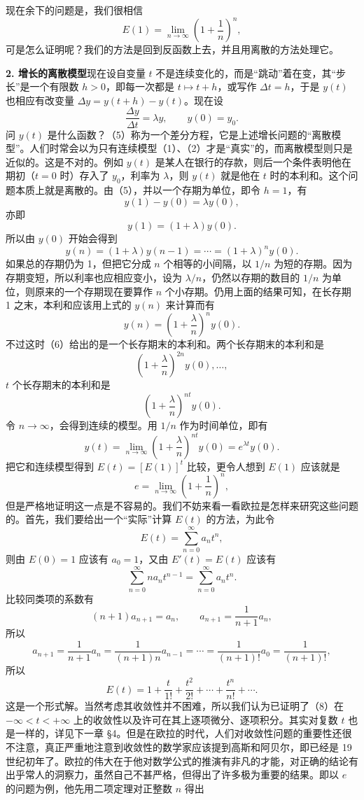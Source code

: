 现在余下的问题是，我们很相信
\[
E(1)=\lim_{n\to\infty}\left(1+\frac1n\right)^n,
\]
可是怎么证明呢？我们的方法是回到反函数上去，并且用离散的方法处理它。

\textbf{2. 增长的离散模型}\quad 现在设自变量 $t$ 不是连续变化的，而是“跳动”着在变，其“步长”是一个有限数 $h>0$，即每一次都是 $t\mapsto t+h$，或写作 $\Delta t=h$，于是 $y(t)$ 也相应有改变量 $\Delta y=y(t+h)-y(t)$。现在设
\[
\frac{\Delta y}{\Delta t}=\lambda y,\qquad y(0)=y_0. \tag{5}
\]
问 $y(t)$ 是什么函数？（5）称为一个差分方程，它是上述增长问题的“离散模型”。人们时常会以为只有连续模型（1）、（2）才是“真实”的，而离散模型则只是近似的。这是不对的。例如 $y(t)$ 是某人在银行的存款，则后一个条件表明他在期初（$t=0$ 时）存入了 $y_0$，利率为 $\lambda$，则 $y(t)$ 就是他在 $t$ 时的本利和。这个问题本质上就是离散的。由（5），并以一个存期为单位，即令 $h=1$，有
\[
y(1)-y(0)=\lambda y(0),
\]
亦即
\[
y(1)=(1+\lambda)y(0).
\]
所以由 $y(0)$ 开始会得到
\[
y(n)=(1+\lambda)y(n-1)=\cdots=(1+\lambda)^ny(0).
\]
如果总的存期仍为 1，但把它分成 $n$ 个相等的小间隔，以 $1/n$ 为短的存期。因为存期变短，所以利率也应相应变小，设为 $\lambda/n$，仍然以存期的数目的 $1/n$ 为单位，则原来的一个存期现在要算作 $n$ 个小存期。仍用上面的结果可知，在长存期 1 之末，本利和应该用上式的 $y(n)$ 来计算而有
\[
y(n)=\left(1+\frac{\lambda}{n}\right)^ny(0). \tag{6}
\]
不过这时（6）给出的是一个长存期末的本利和。两个长存期末的本利和是
\[
\left(1+\frac{\lambda}{n}\right)^{2n}y(0),\ldots,
\]
$t$ 个长存期末的本利和是
\[
\left(1+\frac{\lambda}{n}\right)^{nt}y(0).
\]
令 $n\to\infty$，会得到连续的模型。用 $1/n$ 作为时间单位，即有
\[
y(t)=\lim_{n\to\infty}\left(1+\frac{\lambda}{n}\right)^{nt}y(0)=e^{\lambda t}y(0). \tag{7}
\]
把它和连续模型得到 $E(t)=[E(1)]^t$ 比较，更令人想到 $E(1)$ 应该就是
\[
e=\lim_{n\to\infty}\left(1+\frac1n\right)^n,
\]
但是严格地证明这一点是不容易的。我们不妨来看一看欧拉是怎样来研究这些问题的。首先，我们要给出一个“实际”计算 $E(t)$ 的方法，为此令
\[
E(t)=\sum_{n=0}^{\infty}a_nt^n,
\]
则由 $E(0)=1$ 应该有 $a_0=1$，又由 $E'(t)=E(t)$ 应该有
\[
\sum_{n=0}^{\infty}na_nt^{n-1}=\sum_{n=0}^{\infty}a_nt^n.
\]
比较同类项的系数有
\[
(n+1)a_{n+1}=a_n,\qquad a_{n+1}=\frac{1}{n+1}a_n,
\]
所以
\[
a_{n+1}=\frac{1}{n+1}a_n=\frac{1}{(n+1)n}a_{n-1}=\cdots=\frac{1}{(n+1)!}a_0=\frac{1}{(n+1)!},
\]
所以
\[
E(t)=1+\frac{t}{1!}+\frac{t^2}{2!}+\cdots+\frac{t^n}{n!}+\cdots. \tag{8}
\]
这是一个形式解。当然考虑其收敛性并不困难，所以我们认为已证明了（8）在 $-\infty<t<+\infty$ 上的收敛性以及许可在其上逐项微分、逐项积分。其实对复数 $t$ 也是一样的，详见下一章 §4。但是在欧拉的时代，人们对收敛性问题的重要性还很不注意，真正严重地注意到收敛性的数学家应该提到高斯和阿贝尔，即已经是 19 世纪初年了。欧拉的伟大在于他对数学公式的推演有非凡的才能，对正确的结论有出乎常人的洞察力，虽然自己不甚严格，但得出了许多极为重要的结果。即以 $e$ 的问题为例，他先用二项定理对正整数 $n$ 得出
